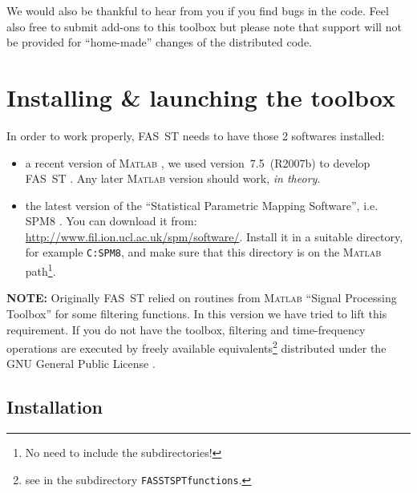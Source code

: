 \documentclass[a4paper,titlepage]{article}
\def\dblS{\hbox{S\hskip -4.5pt S}}
\newcommand{\bi}{\begin{itemize}}
\newcommand{\ei}{\end{itemize}}
\newcommand{\bslash}{\texttt{\symbol{92}}}
\newcommand{\matlab}{\textsc{Matlab }}
\newcommand{\fasst}{FA\dblS T } 	%
\begin{document}
We would also be thankful to hear from you if you find bugs in the code.
Feel also free to submit add-ons to this toolbox but please note that support will not be provided for ``home-made'' changes of the distributed code.

\section{Installing \& launching the toolbox}
\label{sec:Installation}



In order to work properly, \fasst needs to have those 2 softwares installed:
\bi
\item a recent version of \matlab, we used version~7.5~(R2007b) to develop \fasst\hspace{-4pt}. Any later \matlab version should work, {\it in theory}.
\item the latest version of the ``Statistical Parametric Mapping Software'', i.e. SPM8 \cite{SPM8,Litvak2011}. You can download it from: \url{http://www.fil.ion.ucl.ac.uk/spm/software/}. Install it in a suitable directory, for example {\tt C:\bslash SPM8\bslash }, and make sure that this directory is on the \matlab path\footnote{No need to include the subdirectories!}.
\ei

{\bf NOTE:} Originally \fasst relied on routines from \matlab ``Signal Processing Toolbox''  for some filtering functions. In this version we have tried to lift this requirement. If you do not have the toolbox, filtering and time-frequency operations are executed by freely available equivalents\footnote{see in the subdirectory {\tt \bslash FASST\bslash SPTfunctions}.} distributed under the GNU General Public License .

\subsection{Installation}
\end{document}
